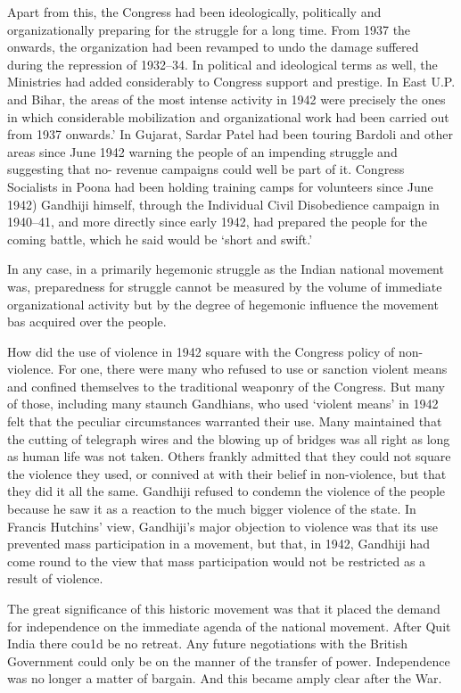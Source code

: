 Apart from this, the Congress had been ideologically, politically and organizationally preparing for the struggle for a long time. From 1937 the onwards, the organization had been revamped to undo the damage suffered during the repression of 1932--34. In political and ideological terms as well, the Ministries had added considerably to Congress support and prestige. In East U.P. and Bihar, the areas of the most intense activity in 1942 were precisely the ones in which considerable mobilization and organizational work had been carried out from 1937 onwards.' In Gujarat, Sardar Patel had been touring Bardoli and other areas since June 1942 warning the people of an impending struggle and suggesting that no- revenue campaigns could well be part of it. Congress Socialists in Poona had been holding training camps for volunteers since June 1942) Gandhiji himself, through the Individual Civil Disobedience campaign in 1940--41, and more directly since early 1942, had prepared the people for the coming battle, which he said would be `short and swift.'

In any case, in a primarily hegemonic struggle as the Indian national movement was, preparedness for struggle cannot be measured by the volume of immediate organizational activity but by the degree of hegemonic influence the movement bas acquired over the people.

How did the use of violence in 1942 square with the Congress policy of non-violence. For one, there were many who refused to use or sanction violent means and confined themselves to the traditional weaponry of the Congress. But many of those, including many staunch Gandhians, who used `violent means' in 1942 felt that the peculiar circumstances warranted their use. Many maintained that the cutting of telegraph wires and the blowing up of bridges was all right as long as human life was not taken. Others frankly admitted that they could not square the violence they used, or connived at with their belief in non-violence, but that they did it all the same. Gandhiji refused to condemn the violence of the people because he saw it as a reaction to the much bigger violence of the state. In Francis Hutchins' view, Gandhiji's major objection to violence was that its use prevented mass participation in a movement, but that, in 1942, Gandhiji had come round to the view that mass participation would not be restricted as a result of violence.

The great significance of this historic movement was that it placed the demand for independence on the immediate agenda of the national movement. After Quit India there cou1d be no retreat. Any future negotiations with the British Government could only be on the manner of the transfer of power. Independence was no longer a matter of bargain. And this became amply clear after the War.


